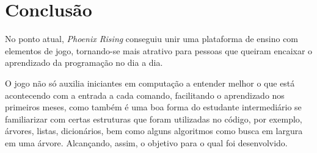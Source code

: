 \chapter{Conclusão}
\label{cap:Conclusão}

No ponto atual, \textit{Phoenix Rising} conseguiu unir uma plataforma de 
ensino com elementos de jogo, tornando-se mais atrativo para pessoas que
queiram encaixar o aprendizado da programação no dia a dia.

O jogo não só auxilia iniciantes em computação a entender melhor o que 
está acontecendo com a entrada a cada comando, facilitando o aprendizado 
nos primeiros meses, como também é uma boa forma do estudante intermediário 
se familiarizar com certas estruturas que foram utilizadas no código, por 
exemplo, árvores, listas, dicionários, bem como alguns algoritmos como busca
em largura em uma árvore. Alcançando, assim, o objetivo para o qual foi
desenvolvido.